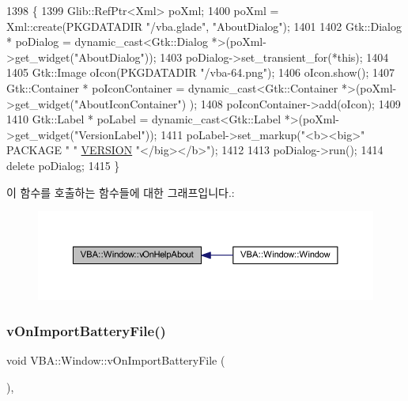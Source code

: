 \begin{DoxyCode}
1398 \{
1399   Glib::RefPtr<Xml> poXml;
1400   poXml = Xml::create(PKGDATADIR \textcolor{stringliteral}{"/vba.glade"}, \textcolor{stringliteral}{"AboutDialog"});
1401 
1402   Gtk::Dialog * poDialog = \textcolor{keyword}{dynamic\_cast<}Gtk::Dialog *\textcolor{keyword}{>}(poXml->get\_widget(\textcolor{stringliteral}{"AboutDialog"}));
1403   poDialog->set\_transient\_for(*\textcolor{keyword}{this});
1404 
1405   Gtk::Image oIcon(PKGDATADIR \textcolor{stringliteral}{"/vba-64.png"});
1406   oIcon.show();
1407   Gtk::Container * poIconContainer = \textcolor{keyword}{dynamic\_cast<}Gtk::Container *\textcolor{keyword}{>}(poXml->get\_widget(\textcolor{stringliteral}{"AboutIconContainer"})
      );
1408   poIconContainer->add(oIcon);
1409 
1410   Gtk::Label * poLabel  = \textcolor{keyword}{dynamic\_cast<}Gtk::Label *\textcolor{keyword}{>}(poXml->get\_widget(\textcolor{stringliteral}{"VersionLabel"}));
1411   poLabel->set\_markup(\textcolor{stringliteral}{"<b><big>"} PACKAGE \textcolor{stringliteral}{" "} \mbox{\hyperlink{_auto_build_8h_a1c6d5de492ac61ad29aec7aa9a436bbf}{VERSION}} \textcolor{stringliteral}{"</big></b>"});
1412 
1413   poDialog->run();
1414   \textcolor{keyword}{delete} poDialog;
1415 \}
\end{DoxyCode}
이 함수를 호출하는 함수들에 대한 그래프입니다.\+:
\nopagebreak
\begin{figure}[H]
\begin{center}
\leavevmode
\includegraphics[width=350pt]{class_v_b_a_1_1_window_a032219499a0266249033431bc86c559f_icgraph}
\end{center}
\end{figure}
\mbox{\label{class_v_b_a_1_1_window_aa376015acdd7b7fe83a67bc1306d3553}} 
\subsubsection{\texorpdfstring{v\+On\+Import\+Battery\+File()}{vOnImportBatteryFile()}}
{\footnotesize\ttfamily void V\+B\+A\+::\+Window\+::v\+On\+Import\+Battery\+File (\begin{DoxyParamCaption}{ }\end{DoxyParamCaption})\hspace{0.3cm}{\ttfamily [protected]}, {\ttfamily [virtual]}}



